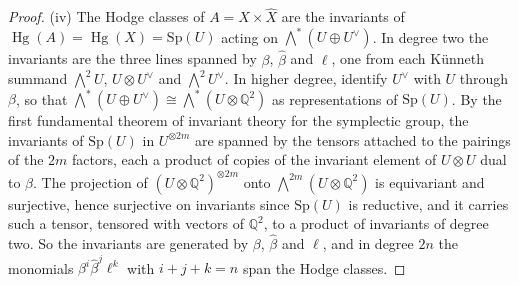 \documentclass[11pt,reqno]{amsart}
\theoremstyle{plain}
\theoremstyle{definition}
\theoremstyle{remark}
\newcommand{\QQ}{\mathbb{Q}}
\DeclareMathOperator{\Hg}{Hg}
\begin{document}
\begin{proof}
(iv) The Hodge classes of $A=X\times\widehat{X}$ are the invariants of
$\Hg(A)=\Hg(X)=\mathrm{Sp}(U)$ acting on
$\bigwedge^{*}(U\oplus U^{\vee})$. In degree two the invariants are the three
lines spanned by $\beta$, $\widehat{\beta}$ and $\ell$, one from each
K\"unneth summand $\bigwedge^{2}U$, $U\otimes U^{\vee}$ and
$\bigwedge^{2}U^{\vee}$. In higher degree, identify $U^{\vee}$ with $U$
through $\beta$, so that $\bigwedge^{*}(U\oplus U^{\vee})\cong
\bigwedge^{*}(U\otimes\QQ^{2})$ as representations of $\mathrm{Sp}(U)$. By the
first fundamental theorem of invariant theory for the symplectic group, the
invariants of $\mathrm{Sp}(U)$ in $U^{\otimes2m}$ are spanned by the tensors
attached to the pairings of the $2m$ factors, each a product of copies of the
invariant element of $U\otimes U$ dual to $\beta$. The projection of
$(U\otimes\QQ^{2})^{\otimes2m}$ onto $\bigwedge^{2m}(U\otimes\QQ^{2})$ is
equivariant and surjective, hence surjective on invariants since
$\mathrm{Sp}(U)$ is reductive, and it carries such a tensor, tensored with
vectors of $\QQ^{2}$, to a product of invariants of degree two. So the
invariants are generated by $\beta$, $\widehat{\beta}$ and $\ell$, and in
degree $2n$ the monomials $\beta^{i}\widehat{\beta}^{j}\ell^{k}$ with
$i+j+k=n$ span the Hodge classes.
\end{proof}
\end{document}
